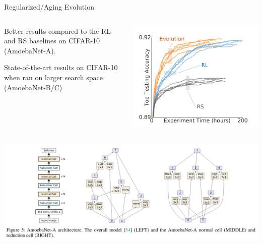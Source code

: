 \begin{frame}[c]{Regularized/Aging Evolution }

\centering
\begin{columns}[T]

\begin{itemize}
	\footnotesize{
	\item Better results compared to the RL and RS baselines on CIFAR-10 (AmoebaNet-A).
	\item State-of-the-art results on CIFAR-10 when ran on larger search space (AmoebaNet-B/C)
	}
\end{itemize}

\includegraphics[width=.9\textwidth]{images_lec7/aging_evolution_results.png}

\end{columns}
\includegraphics[width=.9\textwidth]{images_lec7/amoebanet_A.png}

\end{frame}

